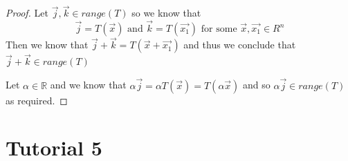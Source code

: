 \documentclass[11pt]{book}
\begin{document}
\begin{proof}
    Let $\vec{j}, \vec{k} \in \mathit{range} {\left( T \right)} $ so we know that 
    \begin{equation*}
        \vec{j} = T\left(\vec{x}\right) \text{ and } \vec{k} = T\left(\vec{x_1}\right) \text{ for some } \vec{x}, \vec{x_1} \in R^{n}
    \end{equation*}
    Then we know that $\vec{j} + \vec{k} = T\left(\vec{x} + \vec{x_1}\right)$ and thus we conclude that $\vec{j} + \vec{k} \in \mathit{range} {\left( T \right)} $ 

    Let $\alpha \in \mathbb{R}$ and we know that $\alpha \vec{j} = \alpha T\left(\vec{x}\right) = T\left(\alpha \vec{x}\right)$ and so $\alpha \vec{j} \in \mathit{range} {\left( T \right)} $ as required.
\end{proof}

\section{Tutorial 5}%
\label{sec:tutorial_5}
\end{document}
